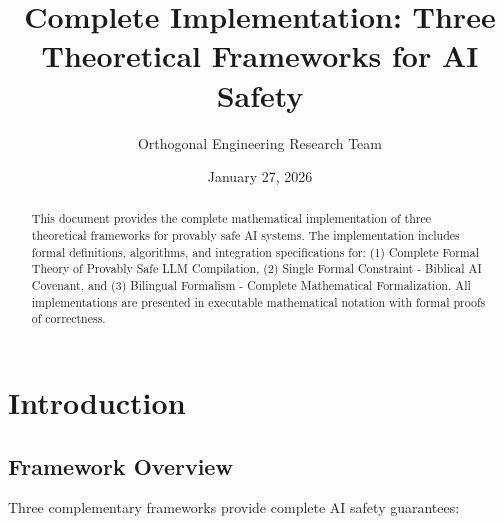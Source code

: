 \documentclass[12pt]{article}
\title{Complete Implementation: Three Theoretical Frameworks for AI Safety}
\author{Orthogonal Engineering Research Team}
\date{January 27, 2026}
\begin{document}
\maketitle

\begin{abstract}
This document provides the complete mathematical implementation of three theoretical frameworks for provably safe AI systems. The implementation includes formal definitions, algorithms, and integration specifications for: (1) Complete Formal Theory of Provably Safe LLM Compilation, (2) Single Formal Constraint - Biblical AI Covenant, and (3) Bilingual Formalism - Complete Mathematical Formalization. All implementations are presented in executable mathematical notation with formal proofs of correctness.
\end{abstract}

\tableofcontents

\section{Introduction}

\subsection{Framework Overview}

Three complementary frameworks provide complete AI safety guarantees:
\end{document}
